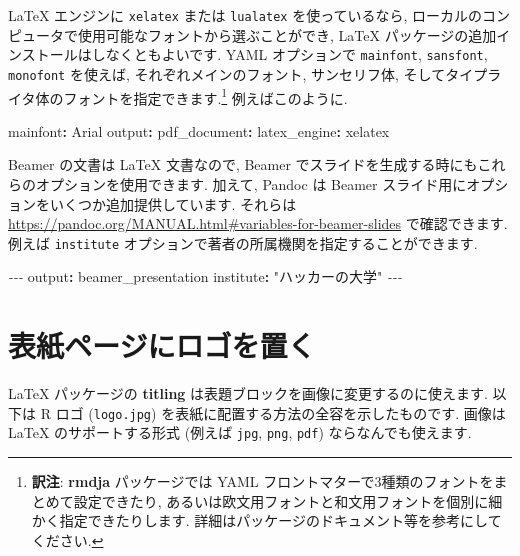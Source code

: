 \documentclass[
  11pt,
  lualatex,ja=standard,jafont=noto]{bxjsreport}
\newenvironment{Shaded}{\begin{snugshade}}{\end{snugshade}}
\newcommand{\AttributeTok}[1]{\textcolor[rgb]{0.77,0.63,0.00}{#1}}
\newcommand{\FunctionTok}[1]{\textcolor[rgb]{0.00,0.00,0.00}{#1}}
\newcommand{\KeywordTok}[1]{\textcolor[rgb]{0.13,0.29,0.53}{\textbf{#1}}}
\newcommand{\PreprocessorTok}[1]{\textcolor[rgb]{0.56,0.35,0.01}{\textit{#1}}}
\newcommand{\StringTok}[1]{\textcolor[rgb]{0.31,0.60,0.02}{#1}}
\begin{document}
LaTeX エンジンに \texttt{xelatex} または \texttt{lualatex} を使っているなら, ローカルのコンピュータで使用可能なフォントから選ぶことができ, LaTeX パッケージの追加インストールはしなくともよいです. YAML オプションで \texttt{mainfont}, \texttt{sansfont}, \texttt{monofont} を使えば, それぞれメインのフォント, サンセリフ体, そしてタイプライタ体のフォントを指定できます.\footnote{\textbf{訳注}: \textbf{rmdja} パッケージでは YAML フロントマターで3種類のフォントをまとめて設定できたり, あるいは欧文用フォントと和文用フォントを個別に細かく指定できたりします. 詳細はパッケージのドキュメント等を参考にしてください.} 例えばこのように.

\begin{Shaded}
\begin{Highlighting}[]
\FunctionTok{mainfont}\KeywordTok{:}\AttributeTok{ Arial}
\FunctionTok{output}\KeywordTok{:}
\AttributeTok{  }\FunctionTok{pdf\_document}\KeywordTok{:}
\AttributeTok{    }\FunctionTok{latex\_engine}\KeywordTok{:}\AttributeTok{ xelatex}
\end{Highlighting}
\end{Shaded}

Beamer の文書は LaTeX 文書なので, Beamer でスライドを生成する時にもこれらのオプションを使用できます. 加えて, Pandoc は Beamer スライド用にオプションをいくつか追加提供しています. それらは \url{https://pandoc.org/MANUAL.html\#variables-for-beamer-slides} で確認できます. 例えば \texttt{institute} オプションで著者の所属機関を指定することができます.

\begin{Shaded}
\begin{Highlighting}[]
\PreprocessorTok{{-}{-}{-}}
\FunctionTok{output}\KeywordTok{:}\AttributeTok{ beamer\_presentation}
\FunctionTok{institute}\KeywordTok{:}\AttributeTok{ }\StringTok{"ハッカーの大学"}
\PreprocessorTok{{-}{-}{-}}
\end{Highlighting}
\end{Shaded}

\hypertarget{latex-logo}{%
\section{表紙ページにロゴを置く}\label{latex-logo}}

LaTeX パッケージの \textbf{titling}  は表題ブロックを画像に変更するのに使えます. 以下は R ロゴ (\texttt{logo.jpg}) を表紙に配置する方法の全容を示したものです. 画像は LaTeX のサポートする形式 (例えば \texttt{jpg}, \texttt{png}, \texttt{pdf}) ならなんでも使えます.
\end{document}
